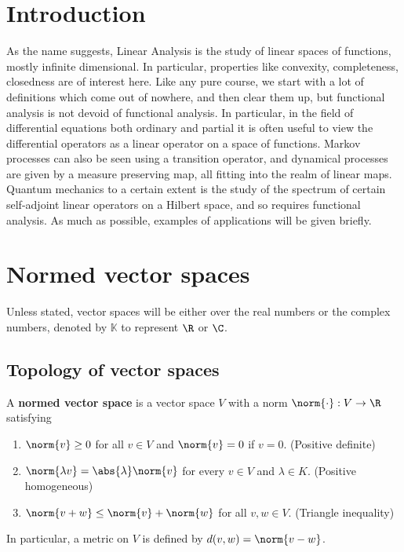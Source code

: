 \documentclass{article}
\newcommand{\K}{\mathbb{K}}
\begin{document}
\maketitle

\section{Introduction}
As the name suggests, Linear Analysis is the study of linear spaces of functions, mostly infinite dimensional. In particular, properties like convexity, completeness, closedness are of interest here.
Like any pure course, we start with a lot of definitions which come out of nowhere, and then clear them up, but functional analysis is not devoid of functional analysis. In particular, in the field of differential equations both ordinary and partial it is often useful to view the differential operators as a linear operator on a space of functions. Markov processes can also be seen using a transition operator, and dynamical processes are given by a measure preserving map, all fitting into the realm of linear maps.  Quantum mechanics to a certain extent is the study of the spectrum of certain self-adjoint linear operators on a Hilbert space, and so requires functional analysis.
As much as possible, examples of applications will be given briefly.

\section{Normed vector spaces}
Unless stated, vector spaces will be either over the real numbers or the complex numbers, denoted by $\K$ to represent $\R$ or $\C$.

\subsection{Topology of vector spaces}
\begin{defi}
    A \textbf{normed vector space} is a vector space $V$ with a norm $\norm{\cdot}: V \to \R$ satisfying
    \begin{enumerate}[label=\roman*.]
        \item $\norm{v} \geq 0$ for all $v \in V$ and $\norm{v} = 0$ if $v=0$. (Positive definite)
        \item $\norm{\lambda v} = \abs{\lambda} \norm{v}$ for every $v \in V$ and $\lambda \in K$. (Positive homogeneous)
        \item $\norm{v + w} \leq \norm{v} + \norm{w}$ for all $v, w \in V$. (Triangle inequality)
    \end{enumerate}
\end{defi}
In particular, a metric\label{def:metric-on-vector-space} on $V$ is defined by $d(v, w) = \norm{v - w}$.
\end{document}
